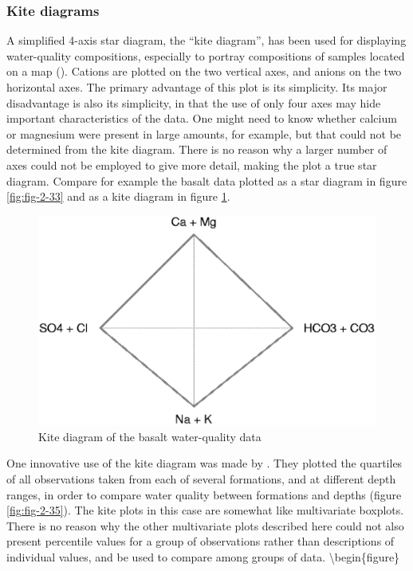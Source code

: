 \documentclass[]{book}
\begin{document}
\hypertarget{kite-diagrams}{%
\subsubsection{Kite diagrams}\label{kite-diagrams}}

A simplified 4-axis star diagram, the ``kite diagram'', has been used for displaying water-quality compositions, especially to portray compositions of samples located on a map (\citet{colby_sedimentation_1956}). Cations are plotted on the two vertical axes, and anions on the two horizontal axes. The primary advantage of this plot is its simplicity. Its major disadvantage is also its simplicity, in that the use of only four axes may hide important characteristics of the data. One might need to know whether calcium or magnesium were present in large amounts, for example, but that could not be determined from the kite diagram. There is no reason why a larger number of axes could not be employed to give more detail, making the plot a true star diagram. Compare for example the basalt data plotted as a star diagram in figure \ref{fig:fig-2-33} and as a kite diagram in figure \ref{fig:fig-2-34}.

\begin{figure}

{\centering \includegraphics[width=13.72in]{figures/2_34} 

}

\caption{Kite diagram of the basalt water-quality data}\label{fig:fig-2-34}
\end{figure}

One innovative use of the kite diagram was made by \citet{davis_assessment_1984}. They plotted the quartiles of all observations taken from each of several formations, and at different depth ranges, in order to compare water quality between formations and depths (figure \ref{fig:fig-2-35}). The kite plots in this case are somewhat like multivariate boxplots. There is no reason why the other multivariate plots described here could not also present percentile values for a group of observations rather than descriptions of individual values, and be used to compare among groups of data.
\textbackslash{}begin\{figure\}
\end{document}
